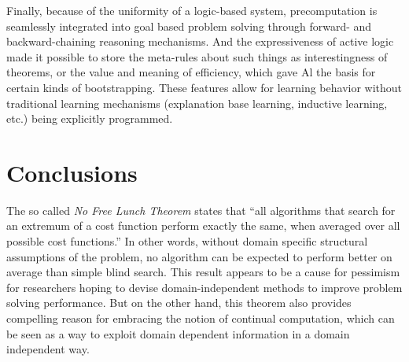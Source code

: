 \documentclass[]{llncs}
\begin{document}
Finally, because of the uniformity of a logic-based system,
precomputation is seamlessly integrated into goal based problem
solving through forward- and backward-chaining reasoning
mechanisms. And the expressiveness of active logic made it possible to
store the meta-rules about such things as interestingness of theorems,
or the value and meaning of efficiency, which gave Al the basis
for certain kinds of bootstrapping.  These features allow for learning
behavior without traditional learning mechanisms (explanation base
learning, inductive learning, etc.) being explicitly programmed.

%
%
%


\section{Conclusions}

The so called \emph{No Free Lunch Theorem}
\cite{wolpert/macready1997:no_free} states that {}``all algorithms that
search for an extremum of a cost function perform exactly the same, when
averaged over all possible cost functions.'' In other words, without domain
specific structural assumptions of the problem, no algorithm can be
expected to perform better on average than simple blind search.  This
result appears to be a cause for pessimism for researchers hoping to devise
domain-independent methods to improve problem solving performance.  But on
the other hand, this theorem also provides compelling reason for embracing
the notion of continual computation, which can be seen as a way to exploit
domain dependent information in a domain independent way.
\end{document}
